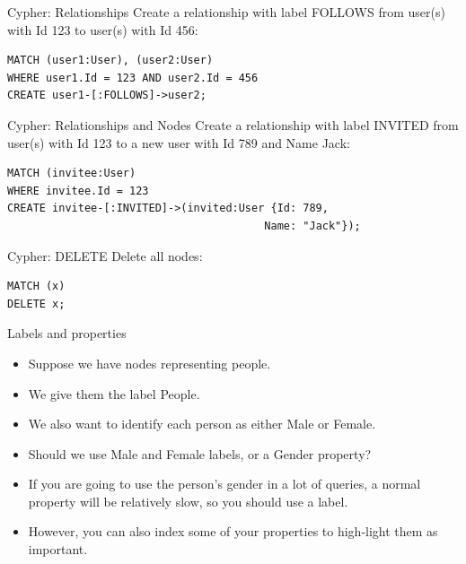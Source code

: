 \begin{frame}[fragile]{Cypher: Relationships}
  Create a relationship with label FOLLOWS from user(s) with Id 123 to user(s) with Id 456: 
  \begin{verbatim}
MATCH (user1:User), (user2:User)
WHERE user1.Id = 123 AND user2.Id = 456
CREATE user1-[:FOLLOWS]->user2;
  \end{verbatim}
\end{frame}

\begin{frame}[fragile]{Cypher: Relationships and Nodes}
  Create a relationship with label INVITED from user(s) with Id 123 to a new user with Id 789 and Name Jack: 
  \begin{verbatim}
MATCH (invitee:User)
WHERE invitee.Id = 123
CREATE invitee-[:INVITED]->(invited:User {Id: 789,
                                        Name: "Jack"});
  \end{verbatim}
\end{frame}


\begin{frame}[fragile]{Cypher: DELETE}
  Delete all nodes: 
  \begin{verbatim}
MATCH (x)
DELETE x;
  \end{verbatim}
\end{frame}

\begin{frame}{Labels and properties}
  \begin{itemize}
    \item Suppose we have nodes representing people.
    \item We give them the label People.
    \item We also want to identify each person as either Male or Female.
    \item Should we use Male and Female labels, or a Gender property?
    \item If you are going to use the person's gender in a lot of queries, a normal property will be relatively slow, so you should use a label.
    \item However, you can also index some of your properties to high-light them as important.
    
  \end{itemize}
\end{frame}

